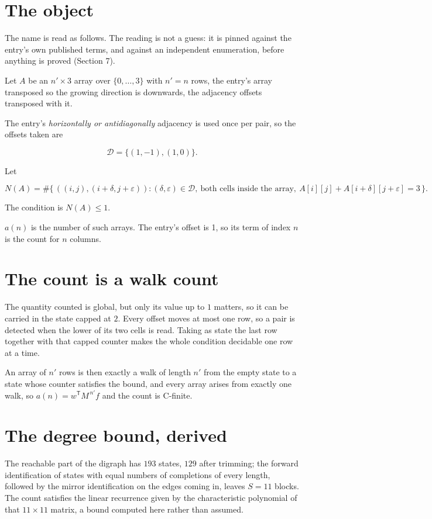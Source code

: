 \documentclass[11pt]{article}
\theoremstyle{definition}
\begin{document}
\section{The object}

The name is read as follows. The reading is not a guess: it is pinned against the entry's own published terms, and against an independent enumeration, before anything is proved (Section 7).

Let $A$ be an $n' \times 3$ array over $\{0,\dots,3\}$ with $n' = n$ rows, the entry's array transposed so the growing direction is downwards, the adjacency offsets transposed with it.

The entry's {\itshape horizontally or antidiagonally} adjacency is used once per pair, so the offsets taken are

\[\mathcal{D} = \{(1,-1), (1,0)\}.\]

Let

\[N(A) = \#\bigl\{\,((i,j),(i{+}\delta,j{+}\varepsilon)) : (\delta,\varepsilon) \in \mathcal{D},\ \text{both cells inside the array},\ A[i][j] + A[i{+}\delta][j{+}\varepsilon] = 3\,\bigr\}.\]

The condition is $N(A) \le 1$.

$a(n)$ is the number of such arrays. The entry's offset is 1, so its term of index $n$ is the count for $n$ columns.

\section{The count is a walk count}

The quantity counted is global, but only its value up to $1$ matters, so it can be carried in the state capped at $2$. Every offset moves at most one row, so a pair is detected when the lower of its two cells is read. Taking as state the last row together with that capped counter makes the whole condition decidable one row at a time.

An array of $n'$ rows is then exactly a walk of length $n'$ from the empty state to a state whose counter satisfies the bound, and every array arises from exactly one walk, so $a(n) = w^{\mathsf T}M^{\,n'}f$ and the count is C-finite.

\section{The degree bound, derived}

The reachable part of the digraph has $193$ states, $129$ after trimming; the forward identification of states with equal numbers of completions of every length, followed by the mirror identification on the edges coming in, leaves $S = 11$ blocks. The count satisfies the linear recurrence given by the characteristic polynomial of that $11\times11$ matrix, a bound computed here rather than assumed.
\end{document}
